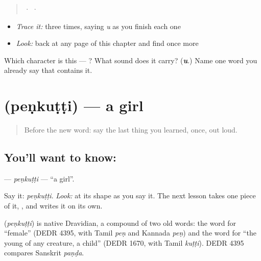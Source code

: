 \begin{quote}
  ·    ·  
\end{quote}

\begin{itemize}
\raggedright
  \item \emph{Trace it:}  three times, saying \emph{u} as you finish each one
  \item \emph{Look:} back at any page of this chapter and find  once more
\end{itemize}

\begin{tcolorbox}[breakable,colback=teal!4,colframe=teal!35!black,title={Before you move on}]
Which character is this — ? What sound does it carry? (\emph{\textbf{u}}.) Name one word you already say that contains it.
\end{tcolorbox}
\section[\texorpdfstring{\ml{പെൺകുട്ടി} (peṇkuṭṭi)}{പെൺകുട്ടി (peṇkuṭṭi)}]{ (peṇkuṭṭi) — a girl}

\label{lesson:ML-C02-penkutti}



\begin{quote}
Before the new word: say the last thing you learned, once, out loud.
\end{quote}

\subsection*{You'll want to know: }
\textbf{} — \emph{peṇkuṭṭi} — \textquotedblleft{}a girl\textquotedblright{}.

Say it: \emph{peṇkuṭṭi}. \emph{Look:} at its shape as you say it. The next lesson takes one piece of it, \textbf{}, and writes it on its own.

\begin{cousinweb}
\textbf{} (\emph{peṇkuṭṭi}) is native Dravidian, a compound of two old words: the word for \textquotedblleft{}female\textquotedblright{} (DEDR 4395, with Tamil \emph{peṇ} and Kannada \emph{peṇ}) and the word for \textquotedblleft{}the young of any creature, a child\textquotedblright{} (DEDR 1670, with Tamil \emph{kuṭṭi}). DEDR 4395 compares Sanskrit \emph{paṇḍa}.
\end{cousinweb}


